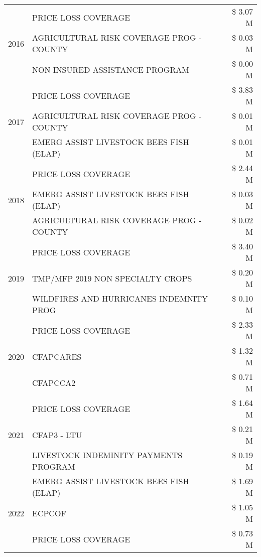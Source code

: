 \begin{tabular}{llr}
\multirow[t]{3}{*}{2016} & PRICE LOSS COVERAGE & \$ 3.07 M \\
 & AGRICULTURAL RISK COVERAGE PROG - COUNTY & \$ 0.03 M \\
 & NON-INSURED ASSISTANCE PROGRAM & \$ 0.00 M \\
\cline{1-3}
\multirow[t]{3}{*}{2017} & PRICE LOSS COVERAGE & \$ 3.83 M \\
 & AGRICULTURAL RISK COVERAGE PROG - COUNTY & \$ 0.01 M \\
 & EMERG ASSIST LIVESTOCK BEES FISH (ELAP) & \$ 0.01 M \\
\cline{1-3}
\multirow[t]{3}{*}{2018} & PRICE LOSS COVERAGE & \$ 2.44 M \\
 & EMERG ASSIST LIVESTOCK BEES FISH (ELAP) & \$ 0.03 M \\
 & AGRICULTURAL RISK COVERAGE PROG - COUNTY & \$ 0.02 M \\
\cline{1-3}
\multirow[t]{3}{*}{2019} & PRICE LOSS COVERAGE & \$ 3.40 M \\
 & TMP/MFP 2019 NON SPECIALTY CROPS & \$ 0.20 M \\
 & WILDFIRES AND HURRICANES INDEMNITY PROG & \$ 0.10 M \\
\cline{1-3}
\multirow[t]{3}{*}{2020} & PRICE LOSS COVERAGE & \$ 2.33 M \\
 & CFAPCARES & \$ 1.32 M \\
 & CFAPCCA2 & \$ 0.71 M \\
\cline{1-3}
\multirow[t]{3}{*}{2021} & PRICE LOSS COVERAGE & \$ 1.64 M \\
 & CFAP3 - LTU & \$ 0.21 M \\
 & LIVESTOCK INDEMINITY PAYMENTS PROGRAM & \$ 0.19 M \\
\cline{1-3}
\multirow[t]{3}{*}{2022} & EMERG ASSIST LIVESTOCK BEES FISH (ELAP) & \$ 1.69 M \\
 & ECPCOF & \$ 1.05 M \\
 & PRICE LOSS COVERAGE & \$ 0.73 M \\
\cline{1-3}
\bottomrule
\end{tabular}
